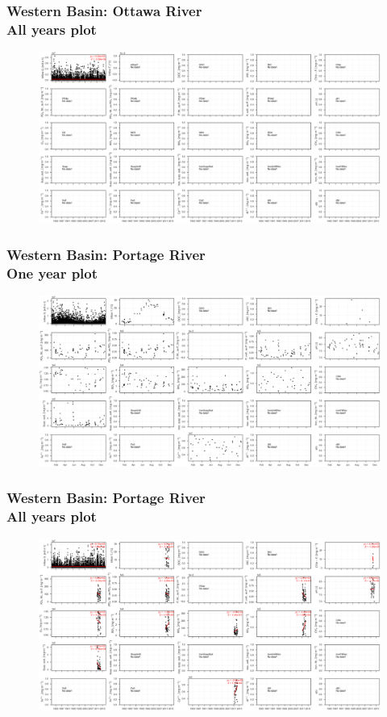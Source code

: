 \documentclass{beamer}
\begin{document}
\begin{frame}
\frametitle{Western Basin: Ottawa River\\ All years plot}
\begin{figure}
\includegraphics[width=\textwidth]{rivers/Western basin/plot_all ottawariver.png}
\end{figure}
\end{frame}

\begin{frame}
\frametitle{Western Basin: Portage River\\ One year plot}
\begin{figure}
\includegraphics[width=\textwidth]{rivers/Western basin/plot_1yr portageriver.png}
\end{figure}
\end{frame}

\begin{frame}
\frametitle{Western Basin: Portage River\\ All years plot}
\begin{figure}
\includegraphics[width=\textwidth]{rivers/Western basin/plot_all portageriver.png}
\end{figure}
\end{frame}
\end{document}
